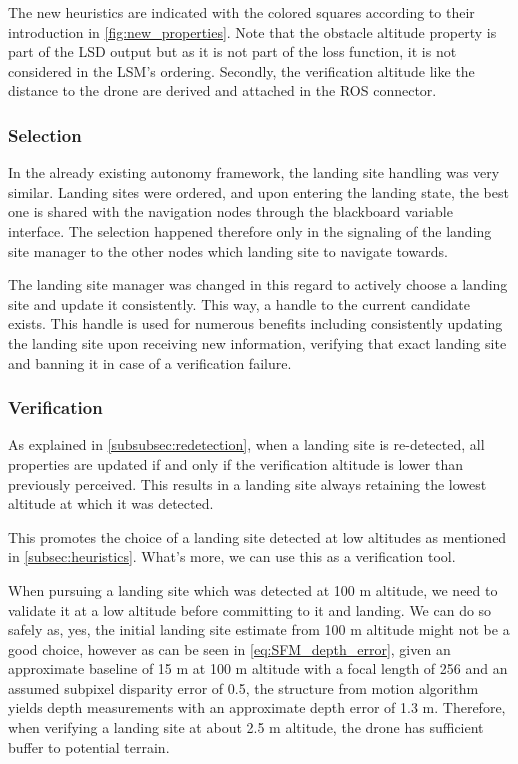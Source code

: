 The new heuristics are indicated with the colored squares according to their introduction in \cref{fig:new_properties}. Note that the obstacle altitude property is part of the LSD output but as it is not part of the loss function, it is not considered in the LSM's ordering. Secondly, the verification altitude like the distance to the drone are derived and attached in the ROS connector.

\subsubsection{Selection}

In the already existing autonomy framework, the landing site handling was very similar. Landing sites were ordered, and upon entering the landing state, the best one is shared with the navigation nodes through the blackboard variable interface. The selection happened therefore only in the signaling of the landing site manager to the other nodes which landing site to navigate towards.

The landing site manager was changed in this regard to actively choose a landing site and update it consistently. This way, a handle to the current candidate exists. This handle is used for numerous benefits including consistently updating the landing site upon receiving new information, verifying that exact landing site and banning it in case of a verification failure. 

\subsubsection{Verification}\label{subsubsec:verification}

As explained in \cref{subsubsec:redetection}, when a landing site is re-detected, all properties are updated if and only if the verification altitude is lower than previously perceived. This results in a landing site always retaining the lowest altitude at which it was detected.

This promotes the choice of a landing site detected at low altitudes as mentioned in \cref{subsec:heuristics}. What's more, we can use this as a verification tool.

When pursuing a landing site which was detected at 100 m altitude, we need to validate it at a low altitude before committing to it and landing. We can do so safely as, yes, the initial landing site estimate from 100 m altitude might not be a good choice, however as can be seen in \cref{eq:SFM_depth_error}, given an approximate baseline of 15 m at 100 m altitude with a focal length of 256 and an assumed subpixel disparity error of 0.5, the structure from motion algorithm yields depth measurements with an approximate depth error of 1.3 m. Therefore, when verifying a landing site at about 2.5 m altitude, the drone has sufficient buffer to potential terrain.

